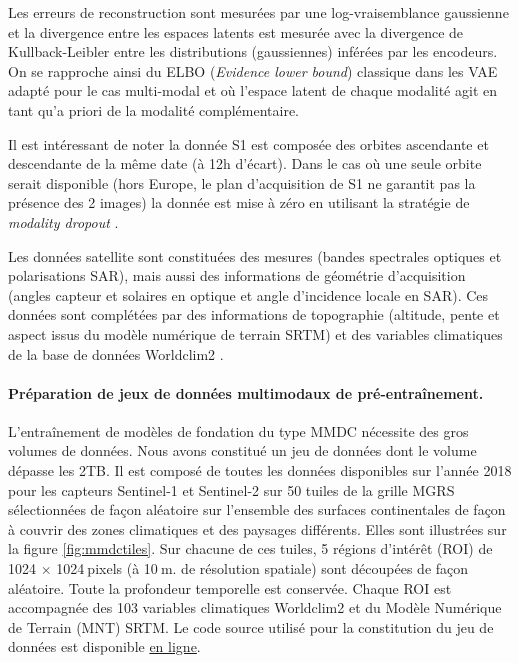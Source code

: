 Les erreurs de reconstruction sont mesurées par une log-vraisemblance gaussienne et la divergence entre les espaces latents est mesurée avec la divergence de Kullback-Leibler entre les distributions (gaussiennes) inférées par les encodeurs. On se rapproche ainsi du ELBO (\textit{Evidence lower bound}) classique dans les VAE adapté pour le cas multi-modal et où l’espace latent de chaque modalité agit en tant qu'a priori de la modalité complémentaire.

Il est intéressant de noter la donnée S1 est composée des orbites ascendante et descendante de la même date (à 12h d’écart). Dans le cas où une seule orbite serait disponible (hors Europe, le plan d’acquisition de S1 ne garantit pas la présence des 2 images) la donnée est mise à zéro en utilisant la stratégie de \textit{modality dropout} \cite{neverova-2016-moddr}.

Les données satellite sont constituées des mesures (bandes spectrales optiques et polarisations SAR), mais aussi des informations de géométrie d’acquisition (angles capteur et solaires en optique et angle d’incidence locale en SAR). Ces données sont complétées par des informations de topographie (altitude, pente et aspect issus du modèle numérique de terrain SRTM) et des variables climatiques de la base de données Worldclim2 \cite{fick17_world}.

\paragraph{Préparation de jeux de données multimodaux de pré-entraînement.}

L’entraînement de modèles de fondation du type MMDC nécessite des gros volumes de données. Nous avons constitué un jeu de données dont le volume dépasse les 2TB. Il est composé de toutes les données disponibles sur l’année 2018 pour les capteurs Sentinel-1 et Sentinel-2 sur 50 tuiles de la grille MGRS sélectionnées de façon aléatoire sur l’ensemble des surfaces continentales de façon à couvrir des zones climatiques et des paysages différents. Elles sont illustrées sur la figure \ref{fig:mmdctiles}. Sur chacune de ces tuiles, 5 régions d’intérêt (ROI) de 1024 $\times$ 1024$\:$pixels (à 10$\:$m. de résolution spatiale) sont découpées de façon aléatoire. Toute la profondeur temporelle est conservée. Chaque ROI est accompagnée des 103 variables climatiques Worldclim2 et du Modèle Numérique de Terrain (MNT) SRTM. Le code source utilisé pour la constitution du jeu de données est disponible \href{https://src.koda.cnrs.fr/mmdc/mmdc-datacollection}{en ligne}.


